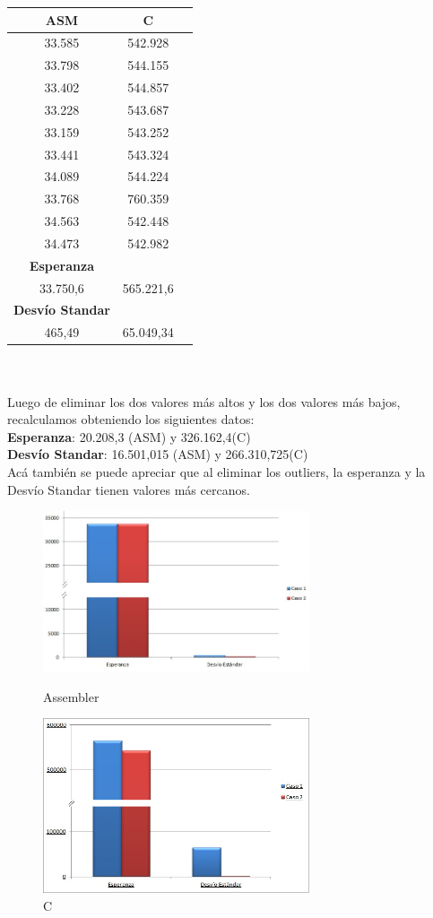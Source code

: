         \begin{tabular}[c]{|c|c|c|}
	\hline
		\textbf{ASM} & \textbf{C}\\
		\hline
33.585 &	542.928 \\
\hline
33.798 &	544.155 \\
\hline
33.402 &	544.857 \\
\hline
33.228 &	543.687 \\
\hline
33.159 &	543.252 \\
\hline
33.441 &	543.324 \\
\hline
34.089 &	544.224 \\ 
\hline
33.768 &	760.359 \\ 
\hline
34.563 &	542.448 \\
\hline
34.473 &	542.982 \\
\hline
		\textbf{Esperanza}	\\
		\hline
33.750,6 & 565.221,6	\\		
		\hline
		\textbf{Desvío Standar}	\\
		\hline
465,49 & 65.049,34\\
		\hline
	\end{tabular}\\\\
	Luego de eliminar los dos valores m\'as altos y los dos valores m\'as bajos, recalculamos obteniendo los siguientes datos: \\
	\textbf{Esperanza}: 20.208,3 (ASM) y 326.162,4(C)\\
	\textbf{Desvío Standar}:	16.501,015 (ASM) y 266.310,725(C)\\
	Ac\'a tambi\'en se puede apreciar que al eliminar los outliers, la esperanza y la Desvío Standar tienen valores m\'as cercanos. \\
\newpage
\begin{figure}
  \begin{center}
	\includegraphics[width=0.7\textwidth]{imagenes/13/asm2.jpg}
	\caption{Assembler}
	\includegraphics[width=0.7\textwidth]{imagenes/13/C2.jpg}
	\caption{C}
  \end{center}
\end{figure}
